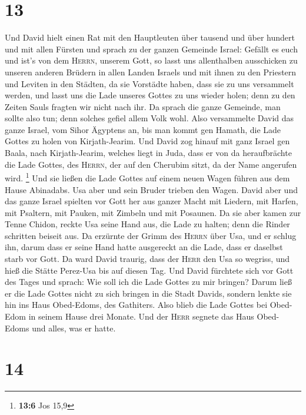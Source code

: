 \hypertarget{section-12}{%
\section{13}\label{section-12}}

 Und David hielt einen Rat mit den Hauptleuten über
tausend und über hundert und mit allen Fürsten  und sprach
zu der ganzen Gemeinde Israel: Gefällt es euch und ist's von dem
\textsc{Herrn}, unserem Gott, so lasst uns allenthalben ausschicken zu
unseren anderen Brüdern in allen Landen Israels und mit ihnen zu den
Priestern und Leviten in den Städten, da sie Vorstädte haben, dass sie
zu uns versammelt werden,  und lasst uns die Lade unseres
Gottes zu uns wieder holen; denn zu den Zeiten Sauls fragten wir nicht
nach ihr.  Da sprach die ganze Gemeinde, man sollte also
tun; denn solches gefiel allem Volk wohl.  Also
versammelte David das ganze Israel, vom Sihor Ägyptens an, bis man kommt
gen Hamath, die Lade Gottes zu holen von Kirjath-Jearim. 
Und David zog hinauf mit ganz Israel gen Baala, nach Kirjath-Jearim,
welches liegt in Juda, dass er von da heraufbrächte die Lade Gottes, des
\textsc{Herrn}, der auf den Cherubim sitzt, da der Name angerufen wird.
\footnote{\textbf{13:6} Jos 15,9}  Und sie ließen die Lade
Gottes auf einem neuen Wagen führen aus dem Hause Abinadabs. Usa aber
und sein Bruder trieben den Wagen.  David aber und das
ganze Israel spielten vor Gott her aus ganzer Macht mit Liedern, mit
Harfen, mit Psaltern, mit Pauken, mit Zimbeln und mit Posaunen.
 Da sie aber kamen zur Tenne Chidon, reckte Usa seine Hand
aus, die Lade zu halten; denn die Rinder schritten beiseit aus.
 Da erzürnte der Grimm des \textsc{Herrn} über Usa, und
er schlug ihn, darum dass er seine Hand hatte ausgereckt an die Lade,
dass er daselbst starb vor Gott.  Da ward David traurig,
dass der \textsc{Herr} den Usa so wegriss, und hieß die Stätte Perez-Usa
bis auf diesen Tag.  Und David fürchtete sich vor Gott
des Tages und sprach: Wie soll ich die Lade Gottes zu mir bringen?
 Darum ließ er die Lade Gottes nicht zu sich bringen in
die Stadt Davids, sondern lenkte sie hin ins Haus Obed-Edoms, des
Gathiters.  Also blieb die Lade Gottes bei Obed-Edom in
seinem Hause drei Monate. Und der \textsc{Herr} segnete das Haus
Obed-Edoms und alles, was er hatte.

\hypertarget{section-13}{%
\section{14}\label{section-13}}

